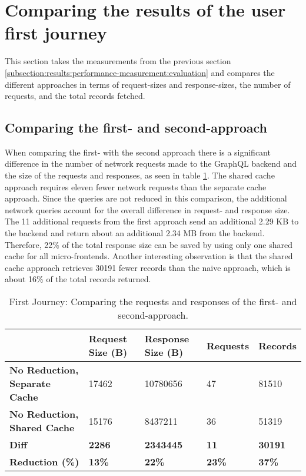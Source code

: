 \section{Comparing the results of the user first journey}\label{section:results:comparison-first-journey}

This section takes the measurements from the previous section \ref{subsection:results:performance-measurement:evaluation} and compares the different approaches in terms of request-sizes and response-sizes, the number of requests, and the total records fetched.

\subsection{Comparing the first- and second-approach}\label{subsection:results:comparison-first-second-approach}

When comparing the first- with the second approach there is a significant difference in the number of network requests made to the GraphQL backend and the size of the requests and responses, as seen in table \ref{table:results:size-comparison-first-path-no-cache-no-reduction-cache-no-reduction}. The shared cache approach requires eleven fewer network requests than the separate cache approach. Since the queries are not reduced in this comparison, the additional network queries account for the overall difference in request- and response size. The 11 additional requests from the first approach send an additional 2.29 KB to the backend and return about an additional 2.34 MB from the backend. Therefore, 22\% of the total response size can be saved by using only one shared cache for all micro-frontends. Another interesting observation is that the shared cache approach retrieves 30191 fewer records than the naive approach, which is about 16\% of the total records returned.

\ifshowTables
\begin{table}[H]
  \begin{tabular}{|l|l|l|l|l|}
  \hline
    & \textbf{Request Size (B)} & \textbf{Response Size (B)} & \textbf{Requests} & \textbf{Records} \\
    \hline
    \textbf{No Reduction, Separate Cache} & 17462 & 10780656 & 47 & 81510 \\
    \hline
    \textbf{No Reduction, Shared Cache} & 15176 & 8437211 & 36 & 51319 \\
    \hline
    \hline
    \textbf{Diff} & \textbf{2286} & \textbf{2343445} & \textbf{11} & \textbf{30191} \\
    \hline
    \textbf{Reduction (\%)} & \textbf{13\%} & \textbf{22\%} & \textbf{23\%} & \textbf{37\%} \\
    \hline
  \end{tabular}
  \caption{First Journey: Comparing the requests and responses of the first- and second-approach.}\label{table:results:size-comparison-first-path-no-cache-no-reduction-cache-no-reduction}
\end{table}
\fi

